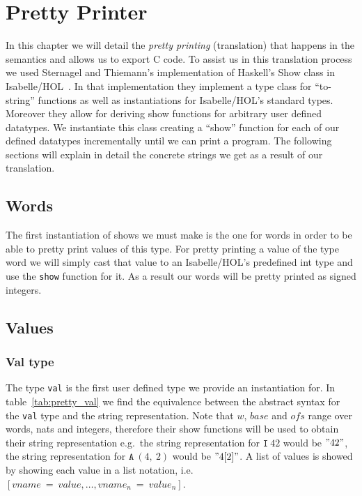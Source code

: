 \chapter{Pretty Printer}\label{chapter:pretty}

In this chapter we will detail the \textit{pretty printing} (translation) that happens in the semantics and allows us to export C code.
To assist us in this translation process we used Sternagel and Thiemann's implementation of Haskell's Show class in Isabelle/HOL~\parencite{Show-AFP}.
In that implementation they implement a type class for ``to-string'' functions as well as instantiations for Isabelle/HOL's standard types.
Moreover they allow for deriving show functions for arbitrary user defined datatypes.
We instantiate this class creating a ``show'' function for each of our defined datatypes incrementally until we can print a program.
The following sections will explain in detail the concrete strings we get as a result of our translation.

\section{Words}\label{section:pretty_words}
The first instantiation of shows we must make is the one for words in order to be able to pretty print values of this type.
For pretty printing a value of the type word we will simply cast that value to an Isabelle/HOL's predefined int type and use the \verb|show| function for it.
As a result our words will be pretty printed as signed integers.

\section{Values}\label{section:pretty_values}

\subsection{Val type}\label{subsection:pretty_val_type}
The type \verb|val| is the first user defined type we provide an instantiation for.
In table~\ref{tab:pretty_val} we find the equivalence between the abstract syntax for the \verb|val| type and the string representation.
Note that $w$, $base$ and $ofs$ range over words, nats and integers, therefore their show functions will be used to obtain their string representation e.g.\ the string representation for $\mathtt{I}\ 42$ would be $"42"$, the string representation for $\mathtt{A}\ (4,\ 2)$ would be $"4[2]"$.
A list of values is showed by showing each value in a list notation, i.e.\ $[vname\ =\ value, \dots, vname_n\ =\ value_n]$.

